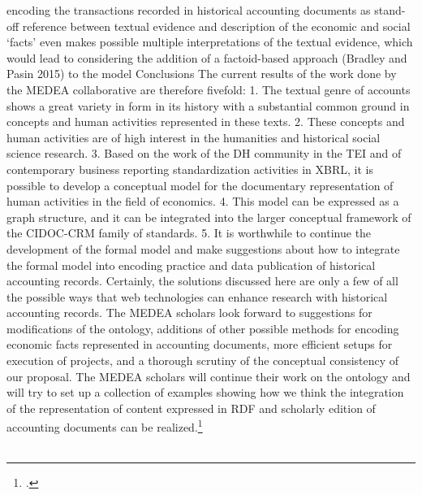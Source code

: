 \documentclass[12pt,a4paper]{article}
\begin{document}
encoding the transactions recorded in historical accounting documents as stand-off reference
between textual evidence and description of the economic and social ‘facts’ even makes possible
multiple interpretations of the textual evidence, which would lead to considering the addition of
a factoid-based approach (Bradley and Pasin 2015) to the model
Conclusions
The current results of the work done by the MEDEA collaborative are therefore fivefold:
1. The textual genre of accounts shows a great variety in form in its history with a
substantial common ground in concepts and human activities represented in these texts.
2. These concepts and human activities are of high interest in the humanities and historical
social science research.
3. Based on the work of the DH community in the TEI and of contemporary business
reporting standardization activities in XBRL, it is possible to develop a conceptual model
for the documentary representation of human activities in the field of economics.
4. This model can be expressed as a graph structure, and it can be integrated into the larger
conceptual framework of the CIDOC-CRM family of standards.
5. It is worthwhile to continue the development of the formal model and make suggestions
about how to integrate the formal model into encoding practice and data publication of
historical accounting records.
Certainly, the solutions discussed here are only a few of all the possible ways that web
technologies can enhance research with historical accounting records. The MEDEA scholars
look forward to suggestions for modifications of the ontology, additions of other possible
methods for encoding economic facts represented in accounting documents, more efficient setups
for execution of projects, and a thorough scrutiny of the conceptual consistency of our proposal.
The MEDEA scholars will continue their work on the ontology and will try to set up a collection
of examples showing how we think the integration of the representation of content expressed in
RDF and scholarly edition of accounting documents can be realized.\footcite[][S.9-12]{tomasekmedea}
\\
\\
\end{document}
